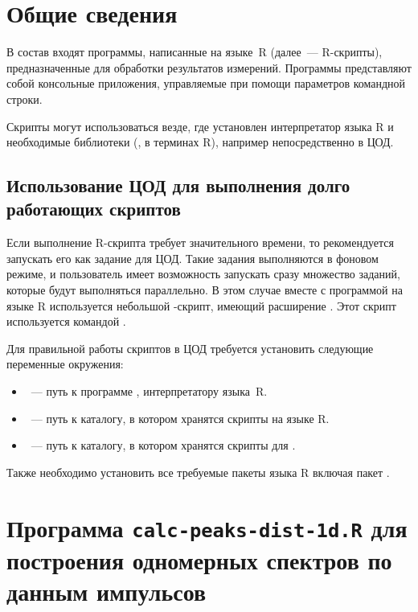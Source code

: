 \section{Общие сведения}

В состав \GD{} входят программы, написанные на языке~R \cite{RLang} (далее~--- R-скрипты), предназначенные для обработки результатов измерений. Программы представляют собой консольные приложения, управляемые при помощи параметров командной строки.

Скрипты могут использоваться везде, где установлен интерпретатор языка R и необходимые библиотеки (,  в терминах R), например непосредственно в ЦОД.

\subsection{Использование ЦОД для выполнения долго работающих скриптов}

Если выполнение R-скрипта требует значительного времени, то рекомендуется запускать его как задание для ЦОД. Такие задания выполняются в фоновом режиме, и пользователь имеет возможность запускать сразу множество заданий, которые будут выполняться параллельно. В этом случае вместе с программой на языке R используется небольшой -скрипт, имеющий расширение . Этот скрипт используется командой  \cite{SlurmSbatch}.

Для правильной работы скриптов в ЦОД требуется установить следующие переменные окружения:

\begin{itemize}

\item {}~--- путь к программе , интерпретатору языка~R.

\item {}~--- путь к каталогу, в котором хранятся скрипты на языке R.

\item {}~--- путь к каталогу, в котором хранятся скрипты для .

\end{itemize}

Также необходимо установить все требуемые пакеты языка R включая пакет .

\section{Программа {\tt calc-peaks-dist-1d.R} для построения одномерных спектров по данным импульсов}

